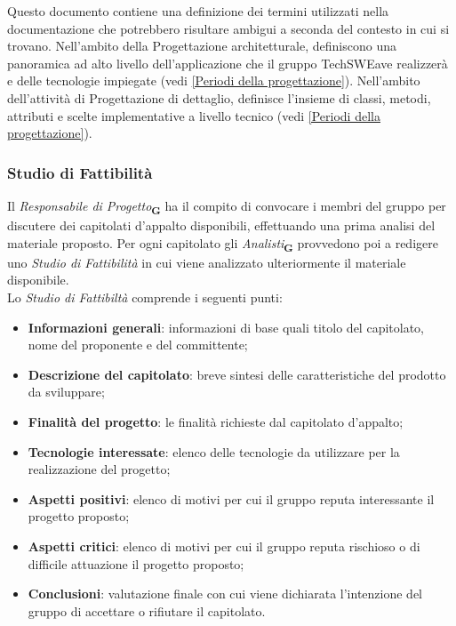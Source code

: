 Questo documento contiene una definizione dei termini utilizzati nella documentazione che potrebbero risultare ambigui a seconda del contesto in cui si trovano.
Nell'ambito della Progettazione architetturale, definiscono una panoramica ad alto livello dell'applicazione che il gruppo
TechSWEave realizzerà e delle tecnologie impiegate (vedi \ref{Periodi della progettazione}).
Nell'ambito dell'attività di Progettazione di dettaglio, definisce l'insieme di classi, metodi, attributi e scelte implementative a livello tecnico (vedi \ref{Periodi della progettazione}).
\subsubsection{Studio di Fattibilità}
Il \textit{Responsabile di Progetto}\textsubscript{\textbf{G}} ha il compito di convocare i membri del gruppo per discutere dei capitolati d'appalto disponibili, effettuando una prima analisi del materiale proposto. Per ogni capitolato gli \textit{Analisti}\textsubscript{\textbf{G}} provvedono poi a redigere uno \textit{Studio di Fattibilità} in cui viene analizzato ulteriormente il materiale disponibile.
\\Lo \textit{Studio di Fattibiltà} comprende i seguenti punti:
\begin{itemize}
    \item \textbf{Informazioni generali}: informazioni di base quali titolo del capitolato, nome del proponente e del committente;
    \item \textbf{Descrizione del capitolato}: breve sintesi delle caratteristiche del prodotto da sviluppare;
    \item \textbf{Finalità del progetto}: le finalità richieste dal capitolato d'appalto;
    \item \textbf{Tecnologie interessate}: elenco delle tecnologie da utilizzare per la realizzazione del progetto;
    \item \textbf{Aspetti positivi}: elenco di motivi per cui il gruppo reputa interessante il progetto proposto;
    \item \textbf{Aspetti critici}: elenco di motivi per cui il gruppo reputa rischioso o di difficile attuazione il progetto proposto;
    \item \textbf{Conclusioni}: valutazione finale con cui viene dichiarata l'intenzione del gruppo di accettare o rifiutare il capitolato.
\end{itemize}
